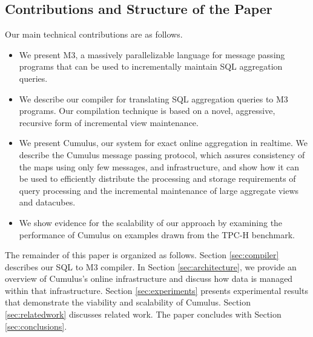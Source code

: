 \subsection{Contributions and Structure of the Paper}


Our main technical contributions are as follows.
\begin{itemize}
\item
We present M3, a massively parallelizable language
for message passing programs that can be used to incrementally maintain
SQL aggregation queries.

\item
We describe our compiler for translating SQL aggregation queries to M3
programs. Our compilation technique is based on a novel, aggressive, recursive
form of incremental view maintenance.

\item
We present Cumulus, our system for exact online aggregation in realtime.
We describe the Cumulus message passing protocol, which assures
consistency of the maps using only few messages, and
infrastructure, and show how it can be used to efficiently distribute the
processing and storage requirements of query processing and
the incremental maintenance of large aggregate views and datacubes.

\item We show evidence for the scalability of our approach by examining the
performance of Cumulus on examples drawn from the TPC-H\cite{tpch2008}
benchmark. 
\end{itemize}


The remainder of this paper is organized as follows.
Section \ref{sec:compiler} describes our SQL to M3 compiler.
In Section \ref{sec:architecture}, we provide an overview of Cumulus's online
infrastructure and discuss how data is managed within that infrastructure.
Section \ref{sec:experiments} presents
experimental results that demonstrate the viability and scalability of
Cumulus.
Section \ref{sec:relatedwork} discusses related work.
The paper concludes with Section \ref{sec:conclusions}.




